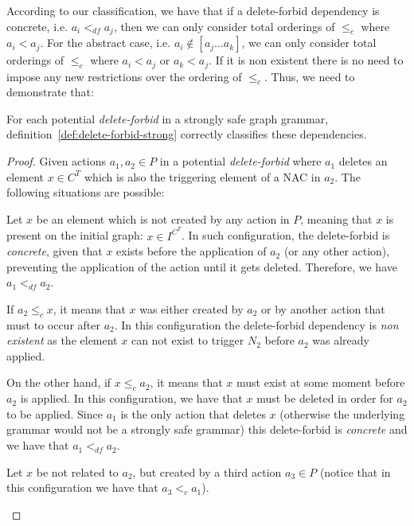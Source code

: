 According to our classification, we have that if a delete-forbid dependency is concrete, i.e. $a_i <_{df} a_j$, then we can only consider total orderings of $\leq_c$ where $a_i < a_j$. For the abstract case, i.e. $a_i \not\in [a_j \ldots a_k]$, we can only consider total orderings of $\leq_c$ where $a_i < a_j$ or $a_k < a_j$. If it is non existent there is no need to impose any new restrictions over the ordering of $\leq_c$. Thus, we need to demonstrate that:

\begin{thm} For each potential \emph{delete-forbid} in a strongly safe graph grammar, definition~\ref{def:delete-forbid-strong} correctly classifies these dependencies.
\end{thm}

\begin{proof} Given actions $a_1,a_2 \in P$ in a potential \emph{delete-forbid} where $a_1$ deletes an element $x \in C^T$ which is also the triggering element of a NAC in $a_2$. The following situations are possible:
\hfill
\begin{description}[style=nextline,leftmargin=*]

  \item [Triggering element is present on the initial graph:]
Let $x$ be an element which is not created by any action in $P$, meaning that $x$ is present on the initial graph: $x \in I^{C^T}$. In such configuration, the delete-forbid is \emph{concrete}, given that $x$ exists before the application of $a_2$ (or any other action), preventing the application of the action until it gets deleted. Therefore, we have $a_1 <_{df} a_2$.

  \item [Triggering element is related to the action:] If $a_2 \leq_c x$, it means that $x$ was either created by $a_2$ or by another action that must to occur after $a_2$. In this configuration the delete-forbid dependency is \emph{non existent} as the element $x$ can not exist to trigger $N_2$ before $a_2$ was already applied.

    On the other hand, if $x \leq_c a_2$, it means that $x$ must exist at some moment before $a_2$ is applied. In this configuration, we have that $x$ must be deleted in order for $a_2$ to be applied. Since $a_1$ is the only action that deletes $x$ (otherwise the underlying grammar would not be a strongly safe grammar) this delete-forbid is \emph{concrete} and we have that $a_1 <_{df} a_2$.

\item [Triggering element is not related to the action:]
  Let $x$ be not related to $a_2$, but created by a third action $a_3 \in P$ (notice that in this configuration we have that $a_3 <_{c} a_1$).


\end{description}
\end{proof}

